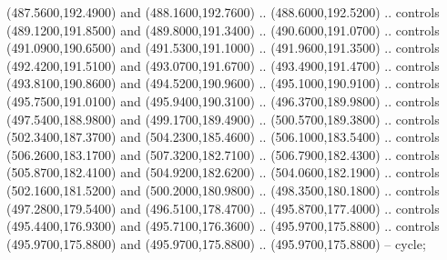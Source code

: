{\begin{scope}[y=0.80pt, x=0.80pt, yscale=-1, xscale=1, inner sep=0pt, outer sep=0pt, #1]
      (487.5600,192.4900) and (488.1600,192.7600) .. (488.6000,192.5200) .. controls
      (489.1200,191.8500) and (489.8000,191.3400) .. (490.6000,191.0700) .. controls
      (491.0900,190.6500) and (491.5300,191.1000) .. (491.9600,191.3500) .. controls
      (492.4200,191.5100) and (493.0700,191.6700) .. (493.4900,191.4700) .. controls
      (493.8100,190.8600) and (494.5200,190.9600) .. (495.1000,190.9100) .. controls
      (495.7500,191.0100) and (495.9400,190.3100) .. (496.3700,189.9800) .. controls
      (497.5400,188.9800) and (499.1700,189.4900) .. (500.5700,189.3800) .. controls
      (502.3400,187.3700) and (504.2300,185.4600) .. (506.1000,183.5400) .. controls
      (506.2600,183.1700) and (507.3200,182.7100) .. (506.7900,182.4300) .. controls
      (505.8700,182.4100) and (504.9200,182.6200) .. (504.0600,182.1900) .. controls
      (502.1600,181.5200) and (500.2000,180.9800) .. (498.3500,180.1800) .. controls
      (497.2800,179.5400) and (496.5100,178.4700) .. (495.8700,177.4000) .. controls
      (495.4400,176.9300) and (495.7100,176.3600) .. (495.9700,175.8800) .. controls
      (495.9700,175.8800) and (495.9700,175.8800) .. (495.9700,175.8800) -- cycle;


\end{scope}}
